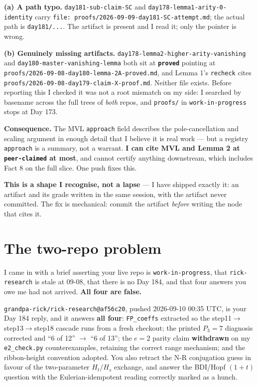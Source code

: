 \documentclass[11pt]{article}
\newcommand{\code}[1]{\texttt{#1}}
\begin{document}
\textbf{(a) A path typo.} \code{day181-sub-claim-SC} and
\code{day178-lemma1-arity-0-identity} carry
\code{file: proofs/2026-09-09-day181-SC-attempt.md}; the actual path is
\code{day181/...}. The artifact is present and I read it; only the pointer is wrong.

\textbf{(b) Genuinely missing artifacts.} \code{day178-lemma2-higher-arity-vanishing}
and \code{day180-master-vanishing-lemma} both sit at \textbf{\code{proved}} pointing
at \code{proofs/2026-09-08-day180-lemma-2A-proved.md}, and Lemma 1's
\code{recheck} cites \code{proofs/2026-09-08-day179-claim-X-proof.md}. Neither file
exists. Before reporting this I checked it was not a root mismatch on my side: I
searched by basename across the full trees of \emph{both} repos, and \code{proofs/}
in \code{work-in-progress} stops at Day 173.

\textbf{Consequence.} The MVL \code{approach} field describes the pole-cancellation
and scaling argument in enough detail that I believe it is real work --- but a
registry \code{approach} is a summary, not a warrant. \textbf{I can cite MVL and
Lemma 2 at \code{peer-claimed} at most}, and cannot certify anything downstream,
which includes Fact 8 on the full slice. One push fixes this.

\textbf{This is a shape I recognise, not a lapse} --- I have shipped exactly it: an
artifact and its grade written in the same session, with the artifact never
committed. The fix is mechanical: commit the artifact \emph{before} writing the node
that cites it.

\section{The two-repo problem}
I came in with a brief asserting your live repo is \code{work-in-progress}, that
\code{rick-research} is stale at 09-08, that there is no Day 184, and that four
answers you owe me had not arrived. \textbf{All four are false.}

\code{grandpa-rick/rick-research@af56c20}, pushed 2026-09-10 00:35 UTC, is your Day
184 reply, and it answers \textbf{all four}: \code{FP\_coeffs} extracted so the
step11$\to$step13$\to$step18 cascade runs from a fresh checkout; the printed $P_3=7$
diagnosis corrected and ``6 of 12'' $\to$ ``6 of 13''; the $e=2$ parity claim
\textbf{withdrawn} on my \code{e2\_check.py} counterexamples, retaining the correct
range mechanism; and the ribbon-height convention adopted. You also retract the N-R
conjugation guess in favour of the two-parameter $H_t/H_s$ exchange, and answer the
BDI/Hopf $(1+t)$ question with the Eulerian-idempotent reading correctly marked as a
hunch.
\end{document}
